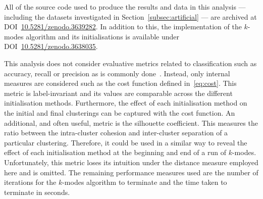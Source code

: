 \documentclass[smallextended]{svjour3}
\begin{document}
\begin{table}[htbp]
    \caption{A summary of the benchmark datasets.}\label{tab:dataset_summary}
\end{table}

All of the source code used to produce the results and data in this analysis ---
including the datasets investigated in Section~\ref{subsec:artificial} --- are
archived at
DOI~\href{https://doi.org/10.5281/zenodo.3639282}{10.5281/zenodo.3639282}. In
addition to this, the implementation of the \(k\)-modes algorithm and its
initialisations is available under
DOI~\href{https://doi.org/10.5281/zenodo.3638035}{10.5281/zenodo.3638035}.

This analysis does not consider evaluative metrics related to classification
such as accuracy, recall or precision as is commonly done~\cite{%
    Arthur2007,Cao2009,Cao2012,Huang1998,%
    Ng2007,Olaode2014,Schaeffer2007,Sharma2015%
}. Instead, only internal measures are considered such as the cost function
defined in~\eqref{eq:cost}. This metric is label-invariant and its values are
comparable across the different initialisation methods. Furthermore, the effect
of each initialisation method on the initial and final clusterings can be
captured with the cost function. An additional, and often useful, metric is the
silhouette coefficient. This measures the ratio between the intra-cluster
cohesion and inter-cluster separation of a particular clustering. Therefore, it
could be used in a similar way to reveal the effect of each initialisation
method at the beginning and end of a run of \(k\)-modes. Unfortunately, this
metric loses its intuition under the distance measure employed here and is
omitted. The remaining performance measures used are the number of iterations
for the \(k\)-modes algorithm to terminate and the time taken to terminate in
seconds.
\end{document}
